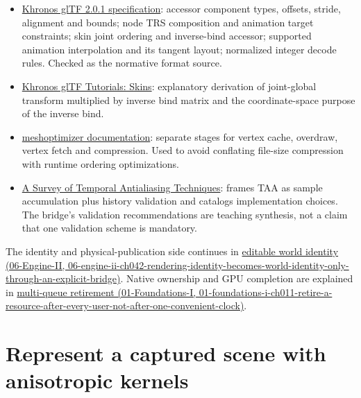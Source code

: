 \begin{itemize}
\tightlist
\item
  \href{https://registry.khronos.org/glTF/specs/2.0/glTF-2.0.html}{Khronos glTF 2.0.1 specification}: accessor component types, offsets, stride, alignment and bounds; node TRS composition and animation target constraints; skin joint ordering and inverse-bind accessor; supported animation interpolation and its tangent layout; normalized integer decode rules. Checked as the normative format source.
\item
  \href{https://github.com/KhronosGroup/glTF-Tutorials/blob/main/gltfTutorial/gltfTutorial_020_Skins.md}{Khronos glTF Tutorials: Skins}: explanatory derivation of joint-global transform multiplied by inverse bind matrix and the coordinate-space purpose of the inverse bind.
\item
  \href{https://meshoptimizer.org/}{meshoptimizer documentation}: separate stages for vertex cache, overdraw, vertex fetch and compression. Used to avoid conflating file-size compression with runtime ordering optimizations.
\item
  \href{https://diglib.eg.org/items/cfa6a05c-53b3-4ee1-979d-48abc6225f6b}{A Survey of Temporal Antialiasing Techniques}: frames TAA as sample accumulation plus history validation and catalogs implementation choices. The bridge's validation recommendations are teaching synthesis, not a claim that one validation scheme is mandatory.
\end{itemize}

The identity and physical-publication side continues in \href{../06-Engine-II/main.pdf\#nameddest=06-engine-ii-ch042-rendering-identity-becomes-world-identity-only-through-an-explicit-bridge}{editable world identity (06-Engine-II, 06-engine-ii-ch042-rendering-identity-becomes-world-identity-only-through-an-explicit-bridge)}. Native ownership and GPU completion are explained in \href{../01-Foundations-I/main.pdf\#nameddest=01-foundations-i-ch011-retire-a-resource-after-every-user-not-after-one-convenient-clock}{multi-queue retirement (01-Foundations-I, 01-foundations-i-ch011-retire-a-resource-after-every-user-not-after-one-convenient-clock)}.

\section{Represent a captured scene with anisotropic kernels}\label{04-visual-computing-ii-ch037-represent-a-captured-scene-with-anisotropic-kernels}


